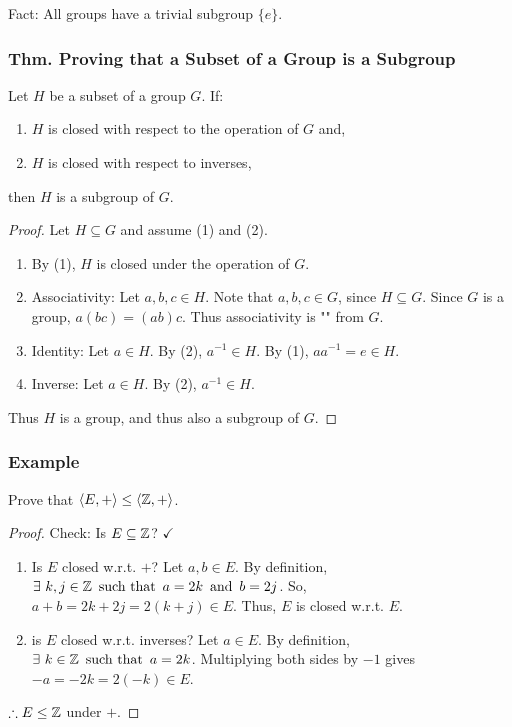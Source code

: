 Fact: All groups have a trivial subgroup $\{e\}$.

\subsubsection{Thm. Proving that a Subset of a Group is a Subgroup}
Let $H$ be a subset of a group $G$. If:
\begin{enumerate}
    \item $H$ is closed with respect to the operation of $G$ and,
    \item $H$ is closed with respect to inverses,
\end{enumerate}
then $H$ is a subgroup of $G$.
\begin{proof}
    Let $H \subseteq G$ and assume (1) and (2).
    \begin{enumerate}
        \item By (1), $H$ is closed under the operation of $G$.
        \item Associativity: Let $a,b,c \in H$. Note that $a,b,c \in G$, since $H \subseteq G$. Since $G$ is a group, $a(bc) = (ab)c$. Thus associativity is "" from $G$.
        \item Identity: Let $a \in H$. By (2), $a^{-1} \in H$. By (1), $aa^{-1} = e \in H$.
        \item Inverse: Let $a \in H$. By (2), $a^{-1} \in H$.
    \end{enumerate}
    Thus $H$ is a group, and thus also a subgroup of $G$.
\end{proof}

\subsubsection*{Example}
Prove that $\langle E,+ \rangle \leq \langle \mathbb{Z},+ \rangle$.
\begin{proof}
    Check: Is $E \subseteq \mathbb{Z}$? $\checkmark$
    \begin{enumerate}
        \item Is $E$ closed w.r.t. $+$?
        Let $a,b \in E$. By definition, $\exists~k,j \in \mathbb{Z} \operatorname{~\text{such that}~} a = 2k \operatorname{~\text{and}~} b = 2j$. So, $a+b = 2k+2j = 2(k+j) \in E$. Thus, $E$ is closed  w.r.t. $E$.
        \item is $E$ closed w.r.t. inverses?
        Let $a \in E$. By definition, $\exists~k \in \mathbb{Z} \operatorname{~\text{such that}~} a = 2k$. Multiplying both sides by $-1$ gives $-a = -2k = 2(-k) \in E$.
    \end{enumerate}
    $\therefore E \leq \mathbb{Z}$ under $+$.
\end{proof}


